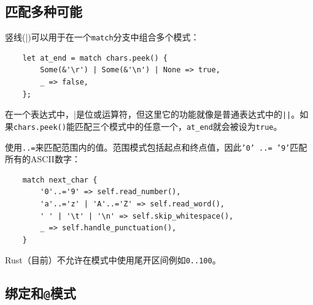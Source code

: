 \subsection{匹配多种可能}
竖线(|)可以用于在一个\texttt{match}分支中组合多个模式：
\begin{verbatim}
    let at_end = match chars.peek() {
        Some(&'\r') | Some(&'\n') | None => true,
        _ => false,
    };
\end{verbatim}

在一个表达式中，|是位或运算符，但这里它的功能就像是普通表达式中的\texttt{||}。如果\texttt{chars.peek()}能匹配三个模式中的任意一个，\texttt{at\_end}就会被设为\texttt{true}。

使用\texttt{..=}来匹配范围内的值。范围模式包括起点和终点值，因此\texttt{'0' ..= '9'}匹配所有的ASCII数字：
\begin{verbatim}
    match next_char {
        '0'..='9' => self.read_number(),
        'a'..='z' | 'A'..='Z' => self.read_word(),
        ' ' | '\t' | '\n' => self.skip_whitespace(),
        _ => self.handle_punctuation(),
    }
\end{verbatim}

Rust（目前）不允许在模式中使用尾开区间例如\texttt{0..100}。

\subsection{绑定和\texttt{@}模式}



